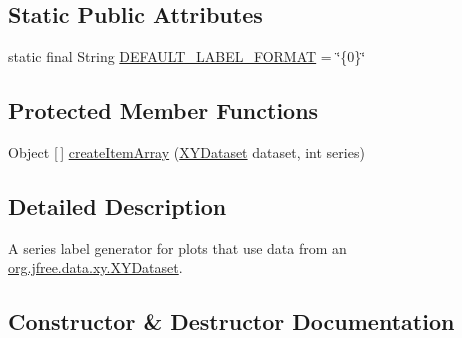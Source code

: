 \subsection*{Static Public Attributes}
\begin{DoxyCompactItemize}
\item 
static final String \mbox{\hyperlink{classorg_1_1jfree_1_1chart_1_1labels_1_1_multiple_x_y_series_label_generator_aa5ec4ddf7469fe98a9ffb629ab51f5d4}{D\+E\+F\+A\+U\+L\+T\+\_\+\+L\+A\+B\+E\+L\+\_\+\+F\+O\+R\+M\+AT}} = \char`\"{}\{0\}\char`\"{}
\end{DoxyCompactItemize}
\subsection*{Protected Member Functions}
\begin{DoxyCompactItemize}
\item 
Object \mbox{[}$\,$\mbox{]} \mbox{\hyperlink{classorg_1_1jfree_1_1chart_1_1labels_1_1_multiple_x_y_series_label_generator_afa878fe498184f6e02d3906542c4be96}{create\+Item\+Array}} (\mbox{\hyperlink{interfaceorg_1_1jfree_1_1data_1_1xy_1_1_x_y_dataset}{X\+Y\+Dataset}} dataset, int series)
\end{DoxyCompactItemize}


\subsection{Detailed Description}
A series label generator for plots that use data from an \mbox{\hyperlink{interfaceorg_1_1jfree_1_1data_1_1xy_1_1_x_y_dataset}{org.\+jfree.\+data.\+xy.\+X\+Y\+Dataset}}. 

\subsection{Constructor \& Destructor Documentation}
\mbox{\label{classorg_1_1jfree_1_1chart_1_1labels_1_1_multiple_x_y_series_label_generator_a5aecc9f15096860ec4fef20a0d789d4c}} 
